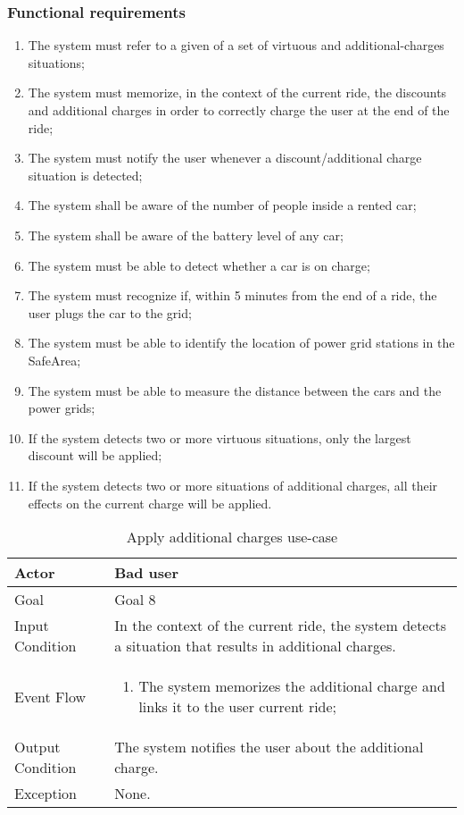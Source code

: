 \subsubsection{Functional requirements}
\begin{enumerate}
\item The system must refer to a given of a set of virtuous and additional-charges situations;
\item The system must memorize, in the context of the current ride, the discounts and additional charges in order to correctly charge the user at the end of the ride;
\item The system must notify the user whenever a discount/additional charge situation is detected;
\item The system shall be aware of the number of people inside a rented car;
\item The system shall be aware of the battery level of any car;
\item The system must be able to detect whether a car is on charge;
\item The system must recognize if, within 5 minutes from the end of a ride, the user plugs the car to the grid;
\item The system must be able to identify the location of power grid stations in the SafeArea;
\item The system must be able to measure the distance between the cars and the power grids;
\item If the system detects two or more virtuous situations, only the largest discount will be applied;
\item If the system detects two or more situations of additional charges, all their effects on the current charge will be applied.
\end{enumerate}

\begin{table}[H]
\begin{center}
\begin{tabular}{p{} | p{}}
\hline
Actor & Bad user\\
\hline
Goal & Goal 8\\
\hline
Input Condition & In the context of the current ride, the system detects a situation that results in additional charges.\\
\hline
Event Flow & 
\begin{enumerate}
\item The system memorizes the additional charge and links it to the user current ride;
\end{enumerate} \\
\hline
Output Condition & The system notifies the user about the additional charge.\\
\hline
Exception & None.\\
\hline
\end{tabular}
\end{center}
\caption{Apply additional charges use-case}
\label{apply_additional_charges_uc}
\end{table}

